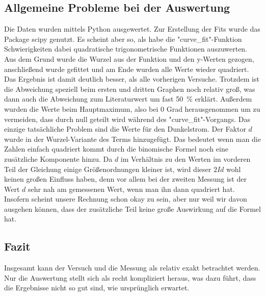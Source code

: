 \subsection{Allgemeine Probleme bei der Auswertung}
Die Daten wurden mittels Python ausgewertet. Zur Erstellung der Fits wurde das Package scipy \cite{scipy} genutzt. Es scheint aber so, als habe die "curve_fit"-Funktion Schwierigkeiten dabei quadratische trigonometrische Funktionen auszuwerten. Aus dem Grund wurde die Wurzel aus der Funktion und den y-Werten gezogen, anschließend wurde gefittet und am Ende wurden alle Werte wieder quadriert. Das Ergebnis ist damit deutlich besser, als alle vorherigen Versuche. Trotzdem ist die Abweichung speziell beim ersten und dritten Graphen noch relativ groß, was dann auch die Abweichung zum Literaturwert um fast \SI{50}{\percent} erklärt. 
Außerdem wurden die Werte beim Hauptmaximum, also bei 0 Grad herausgenommen um zu vermeiden, dass durch null geteilt wird während des "curve_fit"-Vorgangs. 
Das einzige tatsächliche Problem sind die Werte für den Dunkelstrom. Der Faktor $d$ wurde in der Wurzel-Variante des Terms hinzugefügt. Das bedeutet wenn man die Zahlen einfach quadriert kommt durch die binomische Formel noch eine zusätzliche Komponente hinzu. Da $d$ im Verhältnis zu den Werten im vorderen Teil der Gleichung einige Größenordnungen kleiner ist, wird dieser $2 I d$ wohl keinen großen Einfluss haben, denn vor allem bei der zweiten Messung ist der Wert $d$ sehr nah am gemessenen Wert, wenn man ihn dann quadriert hat. Insofern scheint unsere Rechnung schon okay zu sein, aber nur weil wir davon ausgehen können, dass der zusätzliche Teil keine große Auswirkung auf die Formel hat. 

\subsection{Fazit} 
Insgesamt kann der Versuch und die Messung als relativ exakt betrachtet werden. Nur die Auswertung stellt sich als recht kompliziert heraus, was dazu führt, dass die Ergebnisse nicht so gut sind, wie ursprünglich erwartet.  

\newpage
